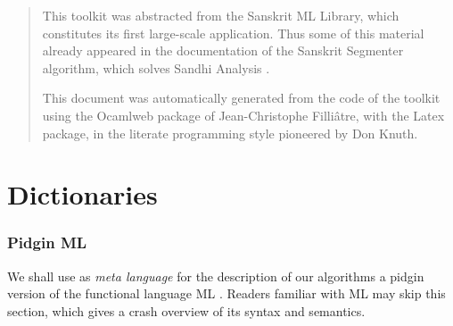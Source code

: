 \begin{abstract}
This toolkit was abstracted from the Sanskrit ML Library, which constitutes
its first large-scale application. Thus some of this material already
appeared in the documentation of the Sanskrit Segmenter algorithm,
which solves Sandhi Analysis \cite{2004-Huet-1}.

This document was automatically generated from the code of the toolkit
using the Ocamlweb package of Jean-Christophe Filli\^atre,
with the Latex package, in the literate programming style pioneered by
Don Knuth. 

\end{abstract}

\part{Dictionaries}

\section{Pidgin ML}

We shall use as {\sl meta language} for the description of our algorithms
a pidgin version of the functional language ML 
\cite{ML-LCF,MLer,paulson,caml}. 
Readers familiar with ML
may skip this section, which gives a crash
overview of its syntax and semantics.

